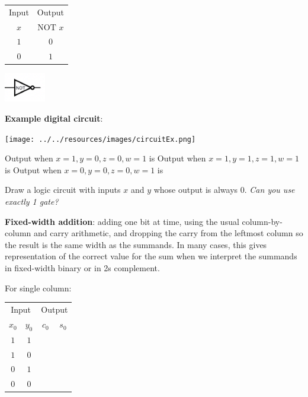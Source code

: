 \documentclass[12pt, oneside]{article}
\begin{document}
\begin{multicols}{2}
\begin{center}\begin{tabular}{c|c}
Input  & Output \\
$x$ & $\text{NOT } x$  \\
\hline
$1$ & $0$\\
$0$ & $1$\\
\end{tabular}\end{center}
\columnbreak
\begin{center}\includegraphics[height=0.5in]{../../resources/images/NOTx.png} \end{center}
\end{multicols}

%
 

{\bf Example digital circuit}: 

\begin{multicols}{2}
\begin{center}
   \texttt{[image: ../../resources/images/circuitEx.png]} 
\end{center}
\columnbreak
Output when $x=1, y=0, z=0, w = 1$ is \underline{\phantom{$~~~0~~~$}}
Output when $x=1, y=1, z=1, w = 1$ is \underline{\phantom{$~~~0~~~$}}
Output when $x=0, y=0, z=0, w = 1$ is \underline{\phantom{$~~~0~~~$}}
\end{multicols}



Draw a logic circuit with inputs $x$ and $y$ whose output  is always $0$.  {\it  Can you use exactly 1 gate?}


\vspace{40pt} \newpage


{\bf Fixed-width addition}: adding one bit at time, using the usual column-by-column and carry arithmetic, and dropping the carry from the leftmost column so the result is the same width as the summands.  In many cases, this gives representation of the correct value for the sum when we interpret the summands
in fixed-width binary or in 2s complement.

For single column:
\begin{center}
\begin{tabular}{cc|cc}
\multicolumn{2}{c|}{Input}  & \multicolumn{2}{|c}{Output}  \\
$x_0$ & $y_0$ & $c_0$ & $s_0$  \\
\hline
$1$ & $1$ & \phantom{$1$} & \phantom{$0$} \\
$1$ & $0$ & \phantom{$0$} & \phantom{$1$}\\
$0$ & $1$ & \phantom{$0$} & \phantom{$1$}\\
$0$ & $0$ & \phantom{$0$} & \phantom{$0$}\\
\end{tabular}
\end{center}
\end{document}
